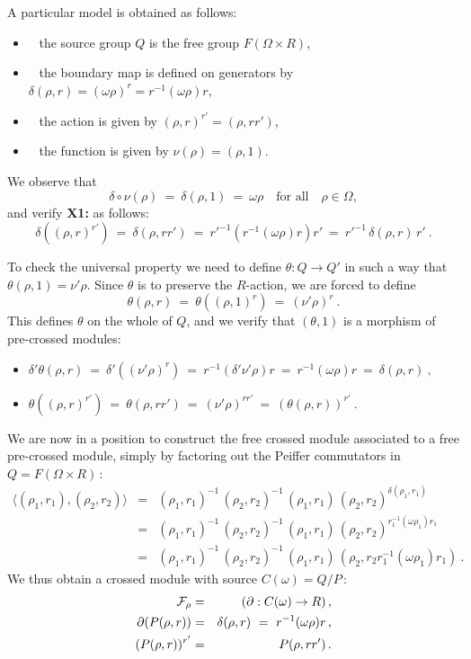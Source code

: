 \bigskip\noindent
A particular model is obtained as follows:
\begin{itemize}
\item~ the source group $Q$ is the free group $F(\Omega \times R)$,
\item~ the boundary map is defined on generators by 
$\delta(\rho,r) = (\omega\rho)^r = r^{-1}(\omega\rho)r$,
\item~ the action is given by $(\rho,r)^{r'} = (\rho,rr')$,
\item~ the function is given by $\nu(\rho) = (\rho,1)$.
\end{itemize}

\noindent
We observe that
$$
\delta\circ\nu(\rho) ~=~ \delta(\rho,1) ~=~ \omega\rho
\quad\text{for all}\quad  \rho \in \Omega,
$$
and verify {\bf X1:} as follows:
$$
\delta((\rho,r)^{r'}) ~=~
\delta(\rho,rr') ~=~
{r'}^{-1}(r^{-1}(\omega\rho)r)r' ~=~
{r'}^{-1}\,\delta(\rho,r)\,r'~.
$$

To check the universal property we need to define
$\theta : Q \to Q'$  in such a way that  $\theta(\rho,1) = \nu'\rho$.
Since $\theta$ is to preserve the $R$-action, we are forced to define
$$
\theta(\rho,r) ~=~ 
\theta((\rho,1)^r) ~=~
(\nu'\rho)^r 
~.
$$
This defines $\theta$ on the whole of $Q$, and we verify that $(\theta,1)$
is a morphism of pre-crossed modules:
\begin{itemize}
\item\quad
$
\delta'\theta(\rho,r) ~=~
\delta'((\nu'\rho)^r) ~=~
r^{-1}(\delta'\nu'\rho)r ~=~
r^{-1}(\omega\rho)r ~=~
\delta(\rho,r) ~,
$
\item\quad
$
\theta((\rho,r)^{r'}) ~=~
\theta(\rho,rr') ~=~
(\nu' \rho)^{rr'} ~=~
(\theta(\rho,r))^{r'} ~.
$
\end{itemize}

We are now in a position to construct the free crossed module
associated to a free pre-crossed module, simply by factoring out
the Peiffer commutators in  $Q = F(\Omega \times R)$\,:
\begin{eqnarray*}
\langle (\rho_1, r_1), (\rho_2, r_2) \rangle 
& = &
(\rho_1, r_1)^{-1}\,(\rho_2, r_2)^{-1}\,
  (\rho_1, r_1)\,(\rho_2, r_2)^{\delta(\rho_1, r_1)}  \\
& = &
(\rho_1, r_1)^{-1}\,(\rho_2, r_2)^{-1}\,
  (\rho_1, r_1)\,(\rho_2, r_2)^{r_1^{-1}(\omega\rho_1)r_1} \\
& = &
(\rho_1, r_1)^{-1}\,(\rho_2, r_2)^{-1}\,
  (\rho_1, r_1)\,(\rho_2, r_2r_1^{-1}(\omega\rho_1)r_1)~. 
\end{eqnarray*}
We thus obtain a crossed module with source  $C(\omega) = Q/P$\,:
\begin{eqnarray*}
\mathcal{F}_{\rho} & = & (\partial : C(\omega) \to R)\,, \\
\partial(P(\rho,r)) & = & \delta(\rho,r) ~=~ r^{-1}(\omega\rho)r\,, \\
(P(\rho,r))^{r'} & = & P(\rho,rr')\,.
\end{eqnarray*}

